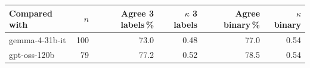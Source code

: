 \begin{tabular}{@{}lrrrrr@{}}
\toprule
Compared with & $n$ & Agree 3 labels\,\% & $\kappa$ 3 labels & Agree binary\,\% & $\kappa$ binary \\
\midrule
gemma-4-31b-it & 100 & 73.0 & 0.48 & 77.0 & 0.54 \\
gpt-oss-120b & 79 & 77.2 & 0.52 & 78.5 & 0.54 \\
\bottomrule
\end{tabular}
